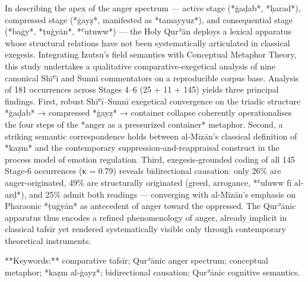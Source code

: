 \begin{LTR}
In describing the apex of the anger spectrum — active stage (*ġaḍab*, *ḥarad*), compressed stage (*ġayẓ*, manifested as *tamayyuz*), and consequential stage (*baġy*, *ṭuġyān*, *ʿutuww*) — the Holy Qurʾān deploys a lexical apparatus whose structural relations have not been systematically articulated in classical exegesis. Integrating Izutsu's field semantics with Conceptual Metaphor Theory, this study undertakes a qualitative comparative-exegetical analysis of nine canonical Shīʿī and Sunnī commentators on a reproducible corpus base. Analysis of 181 occurrences across Stages 4–6 (25 + 11 + 145) yields three principal findings. First, robust Shīʿī–Sunnī exegetical convergence on the triadic structure *ġaḍab* → compressed *ġayẓ* → container collapse coherently operationalises the four steps of the *anger as a pressurized container* metaphor. Second, a striking semantic correspondence holds between al-Mīzān's classical definition of *kaẓm* and the contemporary suppression-and-reappraisal construct in the process model of emotion regulation. Third, exegesis-grounded coding of all 145 Stage-6 occurrences (κ = 0.79) reveals bidirectional causation: only 26\% are anger-originated, 49\% are structurally originated (greed, arrogance, *ʿuluww fī al-arḍ*), and 25\% admit both readings — converging with al-Mīzān's emphasis on Pharaonic *ṭuġyān* as antecedent of anger toward the oppressed. The Qurʾānic apparatus thus encodes a refined phenomenology of anger, already implicit in classical tafsīr yet rendered systematically visible only through contemporary theoretical instruments.

**Keywords:** comparative tafsīr; Qurʾānic anger spectrum; conceptual metaphor; *kaẓm al-ġayẓ*; bidirectional causation; Qurʾānic cognitive semantics.

\end{LTR}

